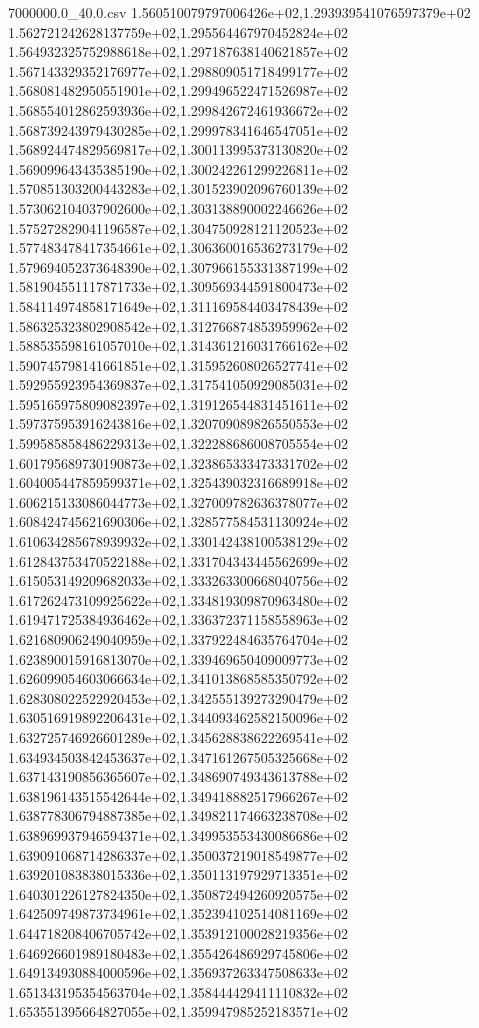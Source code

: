 \begin{filecontents*}{7000000.0_40.0.csv}
1.560510079797006426e+02,1.293939541076597379e+02
1.562721242628137759e+02,1.295564467970452824e+02
1.564932325752988618e+02,1.297187638140621857e+02
1.567143329352176977e+02,1.298809051718499177e+02
1.568081482950551901e+02,1.299496522471526987e+02
1.568554012862593936e+02,1.299842672461936672e+02
1.568739243979430285e+02,1.299978341646547051e+02
1.568924474829569817e+02,1.300113995373130820e+02
1.569099643435385190e+02,1.300242261299226811e+02
1.570851303200443283e+02,1.301523902096760139e+02
1.573062104037902600e+02,1.303138890002246626e+02
1.575272829041196587e+02,1.304750928121120523e+02
1.577483478417354661e+02,1.306360016536273179e+02
1.579694052373648390e+02,1.307966155331387199e+02
1.581904551117871733e+02,1.309569344591800473e+02
1.584114974858171649e+02,1.311169584403478439e+02
1.586325323802908542e+02,1.312766874853959962e+02
1.588535598161057010e+02,1.314361216031766162e+02
1.590745798141661851e+02,1.315952608026527741e+02
1.592955923954369837e+02,1.317541050929085031e+02
1.595165975809082397e+02,1.319126544831451611e+02
1.597375953916243816e+02,1.320709089826550553e+02
1.599585858486229313e+02,1.322288686008705554e+02
1.601795689730190873e+02,1.323865333473331702e+02
1.604005447859599371e+02,1.325439032316689918e+02
1.606215133086044773e+02,1.327009782636378077e+02
1.608424745621690306e+02,1.328577584531130924e+02
1.610634285678939932e+02,1.330142438100538129e+02
1.612843753470522188e+02,1.331704343445562699e+02
1.615053149209682033e+02,1.333263300668040756e+02
1.617262473109925622e+02,1.334819309870963480e+02
1.619471725384936462e+02,1.336372371158558963e+02
1.621680906249040959e+02,1.337922484635764704e+02
1.623890015916813070e+02,1.339469650409009773e+02
1.626099054603066634e+02,1.341013868585350792e+02
1.628308022522920453e+02,1.342555139273290479e+02
1.630516919892206431e+02,1.344093462582150096e+02
1.632725746926601289e+02,1.345628838622269541e+02
1.634934503842453637e+02,1.347161267505325668e+02
1.637143190856365607e+02,1.348690749343613788e+02
1.638196143515542644e+02,1.349418882517966267e+02
1.638778306794887385e+02,1.349821174663238708e+02
1.638969937946594371e+02,1.349953553430086686e+02
1.639091068714286337e+02,1.350037219018549877e+02
1.639201083838015336e+02,1.350113197929713351e+02
1.640301226127824350e+02,1.350872494260920575e+02
1.642509749873734961e+02,1.352394102514081169e+02
1.644718208406705742e+02,1.353912100028219356e+02
1.646926601989180483e+02,1.355426486929745806e+02
1.649134930884000596e+02,1.356937263347508633e+02
1.651343195354563704e+02,1.358444429411110832e+02
1.653551395664827055e+02,1.359947985252183571e+02

\end{filecontents*}
